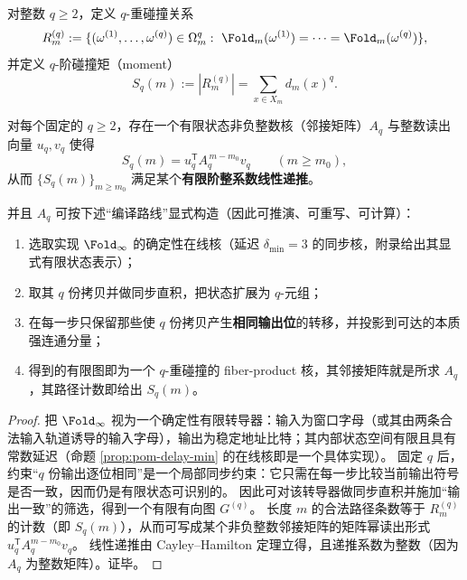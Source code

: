 \begin{definition}\label{def:pom-moment-q}
对整数 \(q\ge 2\)，定义 \(q\)-重碰撞关系
$$
R_m^{(q)}:=
\{(\omega^{(1)},\dots,\omega^{(q)})\in\Omega_m^q:\ \Fold_m(\omega^{(1)})=\cdots=\Fold_m(\omega^{(q)})\},
$$
并定义 \(q\)-阶碰撞矩（moment）
$$
S_q(m):=|R_m^{(q)}|=\sum_{x\in X_m} d_m(x)^q.
$$
\end{definition}

\begin{proposition}\label{prop:pom-moment-kernel-exists}
对每个固定的 \(q\ge 2\)，存在一个有限状态非负整数核（邻接矩阵）\(A_q\) 与整数读出向量 \(u_q,v_q\) 使得
$$
S_q(m)=u_q^{\mathsf T}A_q^{\,m-m_0}v_q\qquad(m\ge m_0),
$$
从而 \(\{S_q(m)\}_{m\ge m_0}\) 满足某个\textbf{有限阶整系数线性递推}。

并且 \(A_q\) 可按下述“编译路线”显式构造（因此可推演、可重写、可计算）：
\begin{enumerate}
  \item 选取实现 \(\Fold_\infty\) 的确定性在线核（延迟 \(\delta_{\min}=3\) 的同步核，附录给出其显式有限状态表示）；
  \item 取其 \(q\) 份拷贝并做同步直积，把状态扩展为 \(q\)-元组；
  \item 在每一步只保留那些使 \(q\) 份拷贝产生\textbf{相同输出位}的转移，并投影到可达的本质强连通分量；
  \item 得到的有限图即为一个 \(q\)-重碰撞的 fiber-product 核，其邻接矩阵就是所求 \(A_q\)，其路径计数即给出 \(S_q(m)\)。
\end{enumerate}
\end{proposition}

\begin{proof}
把 \(\Fold_\infty\) 视为一个确定性有限转导器：输入为窗口字母（或其由两条合法输入轨道诱导的输入字母），输出为稳定地址比特；其内部状态空间有限且具有常数延迟（命题 \ref{prop:pom-delay-min} 的在线核即是一个具体实现）。
固定 \(q\) 后，约束“\(q\) 份输出逐位相同”是一个局部同步约束：它只需在每一步比较当前输出符号是否一致，因而仍是有限状态可识别的。
因此可对该转导器做同步直积并施加“输出一致”的筛选，得到一个有限有向图 \(G^{(q)}\)。
长度 \(m\) 的合法路径条数等于 \(R_m^{(q)}\) 的计数（即 \(S_q(m)\)），从而可写成某个非负整数邻接矩阵的矩阵幂读出形式 \(u_q^{\mathsf T}A_q^{m-m_0}v_q\)。
线性递推由 Cayley--Hamilton 定理立得，且递推系数为整数（因为 \(A_q\) 为整数矩阵）。证毕。
\end{proof}

